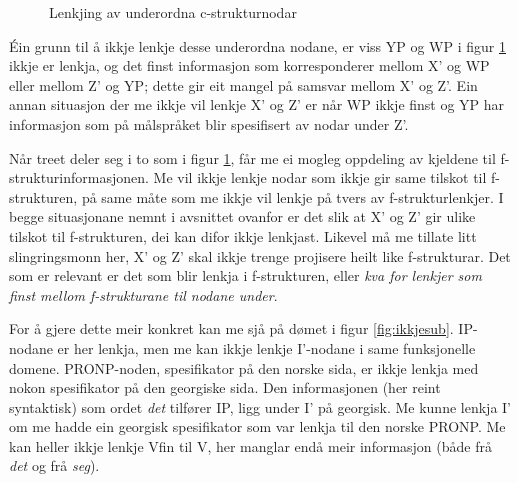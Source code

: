 \documentclass[11pt,a4paper,oneside,draft]{book}
\begin{document}
\begin{figure}[htp]
\centering
   \caption{Lenkjing av underordna c-strukturnodar}
   \label{fig:subnode}
  \end{figure}

Éin grunn til å ikkje lenkje desse underordna nodane, er viss YP og WP
i figur \ref{fig:subnode} ikkje er lenkja, og det finst informasjon
som korresponderer mellom X' og WP eller mellom Z' og YP; dette gir
eit mangel på samsvar mellom X' og Z'.  Ein annan situasjon der me
ikkje vil lenkje X' og Z' er når WP ikkje finst og YP har informasjon
som på målspråket blir spesifisert av nodar under Z'.

Når treet deler seg i to som i figur \ref{fig:subnode}, får me ei
mogleg oppdeling av kjeldene til f-strukturinformasjonen. Me vil ikkje
lenkje nodar som ikkje gir same tilskot til f-strukturen, på same måte
som me ikkje vil lenkje på tvers av f-strukturlenkjer. I begge
situasjonane nemnt i avsnittet ovanfor er det slik at X' og Z' gir
ulike tilskot til f-strukturen, dei kan difor ikkje lenkjast. Likevel
må me tillate litt slingringsmonn her, X' og Z' skal ikkje trenge
projisere heilt like f-strukturar. Det som er relevant er det som blir
lenkja i f-strukturen, eller \emph{kva for lenkjer som finst mellom f-strukturane til nodane under}.

For å gjere dette meir konkret kan me sjå på dømet i figur
\ref{fig:ikkjesub}. IP-nodane er her lenkja, men me kan ikkje lenkje
I'-nodane i same funksjonelle domene. PRONP-noden, spesifikator på den
norske sida, er ikkje lenkja med nokon spesifikator på den georgiske
sida. Den informasjonen (her reint syntaktisk) som ordet \emph{det}
tilfører IP, ligg under I' på georgisk. Me kunne lenkja I' om me hadde
ein georgisk spesifikator som var lenkja til den norske PRONP. Me kan
heller ikkje lenkje Vfin til V, her manglar endå meir informasjon
(både frå \emph{det} og frå \emph{seg}). 
\end{document}
